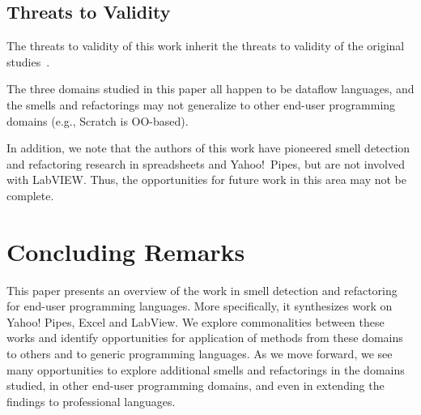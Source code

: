 \documentclass[10pt,conference,compsocconf]{IEEEtran}
\newcommand{\todo}[1]{\textbf{TODO: #1}}
\begin{document}


\subsection{Threats to Validity}
The threats to validity of this work inherit the threats to validity of the original studies~\cite{Stolee2015, Stolee2011, StoleeTSE2013, Hermans2011, Hermans2012intra, Hermans2012inter, hermans2014bumblebee, chambers2013smell, chambers2015impact, badame2012refactoring}.

The three domains studied in this paper all happen to be dataflow languages, and the smells and refactorings may not generalize to other end-user programming domains (e.g., Scratch is OO-based). 

In addition, we note that the authors of this work have pioneered smell detection and refactoring research in spreadsheets and Yahoo!\ Pipes, but are not involved with LabVIEW. Thus, the opportunities for future work in this area may not be complete.  

\section{Concluding Remarks}
\label{sec:conclusions}
This paper presents an overview of the work in smell detection and refactoring for end-user programming languages. More specifically, it synthesizes work on Yahoo! Pipes, Excel and LabView. We explore commonalities between these works and identify opportunities for application of methods from these domains to others and to generic programming languages. As we move forward, we see many opportunities to explore additional smells and refactorings in the domains studied, in other end-user programming domains, and even in extending the findings to professional languages. 
\end{document}
